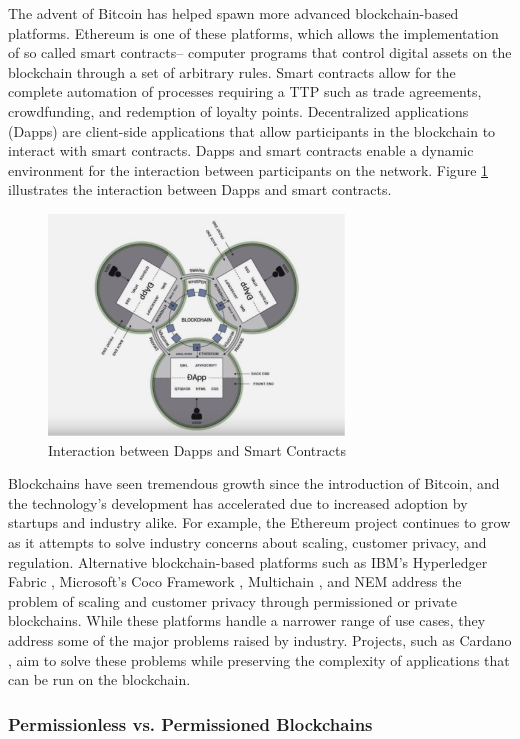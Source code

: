 The advent of Bitcoin has helped spawn more advanced blockchain-based platforms. Ethereum \cite{Wood14} is one of these platforms, which allows the implementation of so called smart contracts-- computer programs that control digital assets on the blockchain through a set of arbitrary rules. Smart contracts allow for the complete automation of processes requiring a TTP such as trade agreements, crowdfunding, and redemption of loyalty points. Decentralized applications (Dapps) are client-side applications that allow participants in the blockchain to interact with smart contracts. Dapps and smart contracts enable a dynamic environment for the interaction between participants on the network. Figure \ref{fig:dapps} illustrates the interaction between Dapps and smart contracts.
%
\begin{figure}[h] %
    \centering
        \includegraphics[keepaspectratio, width=0.7\textwidth]{images/dapps.png}
    \caption{Interaction between Dapps and Smart Contracts} \label{fig:dapps}
\end{figure}

Blockchains have seen tremendous growth since the introduction of Bitcoin, and the technology's development has accelerated due to increased adoption by startups and industry alike. For example, the Ethereum project continues to grow as it attempts to solve industry concerns about scaling, customer privacy, and regulation. Alternative blockchain-based platforms such as IBM's Hyperledger Fabric \cite{HL16}, Microsoft's Coco Framework \cite{Coco17}, Multichain \cite{MC16}, and NEM \cite{NEM} address the problem of scaling and customer privacy through permissioned or private blockchains. While these platforms handle a narrower range of use cases, they address some of the major problems raised by industry. Projects, such as Cardano \cite{Cardano}, aim to solve these problems while preserving the complexity of applications that can be run on the blockchain.

\subsubsection{Permissionless vs. Permissioned Blockchains}